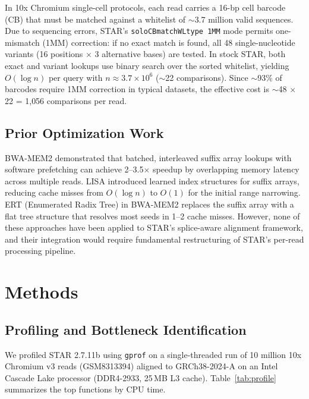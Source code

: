 \documentclass[11pt,twocolumn]{article}
\begin{document}
In 10x Chromium single-cell protocols, each read carries a 16-bp cell barcode (CB) that must be matched against a whitelist of $\sim$3.7 million valid sequences. Due to sequencing errors, STAR's \texttt{soloCBmatchWLtype 1MM} mode permits one-mismatch (1MM) correction: if no exact match is found, all 48 single-nucleotide variants (16 positions $\times$ 3 alternative bases) are tested. In stock STAR, both exact and variant lookups use binary search over the sorted whitelist, yielding $O(\log n)$ per query with $n \approx 3.7 \times 10^6$ ($\sim$22 comparisons). Since $\sim$93\% of barcodes require 1MM correction in typical datasets, the effective cost is $\sim$48 $\times$ 22 = 1{,}056 comparisons per read.

\subsection{Prior Optimization Work}

BWA-MEM2 \citep{vasimuddin2019efficient} demonstrated that batched, interleaved suffix array lookups with software prefetching can achieve 2--3.5$\times$ speedup by overlapping memory latency across multiple reads. LISA \citep{ho2019lisa} introduced learned index structures for suffix arrays, reducing cache misses from $O(\log n)$ to $O(1)$ for the initial range narrowing. ERT (Enumerated Radix Tree) in BWA-MEM2 replaces the suffix array with a flat tree structure that resolves most seeds in 1--2 cache misses. However, none of these approaches have been applied to STAR's splice-aware alignment framework, and their integration would require fundamental restructuring of STAR's per-read processing pipeline.

\section{Methods}

\subsection{Profiling and Bottleneck Identification}

We profiled STAR 2.7.11b using \texttt{gprof} on a single-threaded run of 10 million 10x Chromium v3 reads (GSM8313394) aligned to GRCh38-2024-A on an Intel Cascade Lake processor (DDR4-2933, 25\,MB L3 cache). Table~\ref{tab:profile} summarizes the top functions by CPU time.
\end{document}
